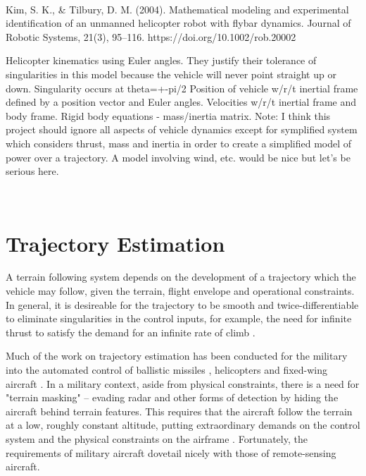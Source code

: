 ~~~

\cite{Kim2004}
Kim, S. K., \& Tilbury, D. M. (2004). Mathematical modeling and experimental identification of an unmanned helicopter robot with flybar dynamics. Journal of Robotic Systems, 21(3), 95–116. https://doi.org/10.1002/rob.20002

Helicopter kinematics using Euler angles. They justify their tolerance of singularities in this model because the vehicle will never point straight up or down. Singularity occurs at theta=+-pi/2
Position of vehicle w/r/t inertial frame defined by a position vector and Euler angles.
Velocities w/r/t inertial frame and body frame.
Rigid body equations - mass/inertia matrix.
Note: I think this project should ignore all aspects of vehicle dynamics except for symplified system which considers thrust, mass and inertia in order to create a simplified model of power over a trajectory. A model involving wind, etc. would be nice but let’s be serious here.


~~~




\section{Trajectory Estimation}

A terrain following system depends on the development of a trajectory which the vehicle may follow, given the terrain, flight envelope and operational constraints. In general, it is desireable for the trajectory to be smooth and twice-differentiable to eliminate singularities in the control inputs, for example, the need for infinite thrust to satisfy the demand for an infinite rate of climb \cite{MENON1991,Funk1977}. 

Much of the work on trajectory estimation has been conducted for the military into the automated control of ballistic missiles \cite{Dressler1968}, helicopters and fixed-wing aircraft \cite{MENON1991,Funk1977}. In a military context, aside from physical constraints, there is a need for "terrain masking" -- evading radar and other forms of detection by hiding the aircraft behind terrain features. This requires that the aircraft follow the terrain at a low, roughly constant altitude, putting extraordinary demands on the control system and the physical constraints on the airframe \cite{MENON1991}. Fortunately, the requirements of military aircraft dovetail nicely with those of remote-sensing aircraft.

